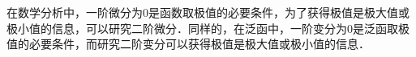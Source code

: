 
在数学分析中，一阶微分为0是函数取极值的必要条件，为了获得极值是极大值或极小值的信息，可以研究二阶微分．同样的，在泛函中，一阶变分为0是泛函取极值的必要条件，而研究二阶变分可以获得极值是极大值或极小值的信息．


